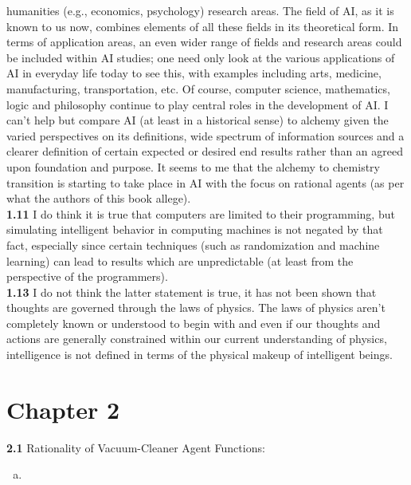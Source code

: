 \documentclass{scrartcl}
\begin{document}
humanities (e.g., economics, psychology) research areas. The field of AI, as it is known to us now,
combines elements of all these fields in its theoretical form. In terms of application areas, an
even wider range of fields and research areas could be included within AI studies; one need only
look at the various applications of AI in everyday life today to see this, with examples including
arts, medicine, manufacturing, transportation, etc. Of course, computer science, mathematics, logic
and philosophy continue to play central roles in the development of AI. I can't help but compare AI
(at least in a historical sense) to alchemy given the varied perspectives on its definitions, wide
spectrum of information sources and a clearer definition of certain expected or desired end results
rather than an agreed upon foundation and purpose. It seems to me that the alchemy to chemistry
transition is starting to take place in AI with the focus on rational agents (as per what the
authors of this book allege).
\bigskip
\\
\textbf{1.11} I do think it is true that computers are limited to their programming, but simulating
intelligent behavior in computing machines is not negated by that fact, especially since certain
techniques (such as randomization and machine learning) can lead to results which are unpredictable
(at least from the perspective of the programmers).
\bigskip
\\
\textbf{1.13} I do not think the latter statement is true, it has not been shown that thoughts are
governed through the laws of physics. The laws of physics aren't completely known or understood to
begin with and even if our thoughts and actions are generally constrained within our current
understanding of physics, intelligence is not defined in terms of the physical makeup of intelligent
beings.
\section*{Chapter 2}
\textbf{2.1} Rationality of Vacuum-Cleaner Agent Functions:
\begin{enumerate}[(a)]
    \item
\end{enumerate}
\end{document}
